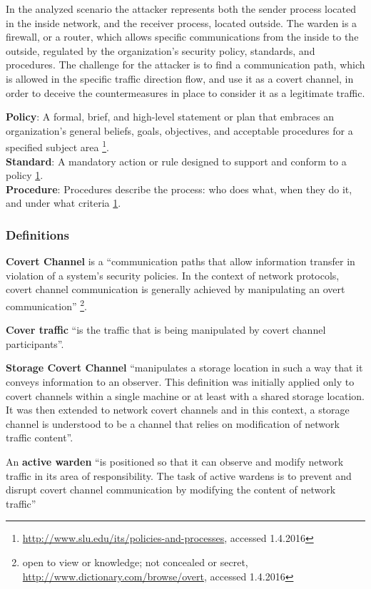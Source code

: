 \documentclass[12pt]{article}
\begin{document}
In the analyzed scenario the attacker represents both the sender process located in the inside network, and the receiver process, located outside. The warden is a firewall, or a router, which allows specific communications from the inside to the outside, regulated by the organization's security policy, standards, and procedures. The challenge for the attacker is to find a communication path, which is allowed in the specific traffic direction flow, and use it as a covert channel, in order to deceive the countermeasures in place to consider it as a legitimate traffic.

\textbf{Policy}: A formal, brief, and high-level statement or plan that embraces an organization's general beliefs, goals, objectives, and acceptable procedures for a specified subject area \footnote{\label{policy}\url{http://www.slu.edu/its/policies-and-processes}, accessed 1.4.2016}.\\
\textbf{Standard}: A mandatory action or rule designed to support and conform to a policy \cref{policy}.\\
\textbf{Procedure}: Procedures describe the process: who does what, when they do it, and under what criteria \cref{policy}.

\subsubsection{Definitions}
\label{subsub:definitions}

\textbf{Covert Channel} is a ``communication paths that allow information transfer in violation of a system’s security policies. In the context of network protocols, covert channel communication is generally achieved by manipulating an overt communication''\cite{netaware} \footnote{open to view or knowledge; not concealed or secret, \url{http://www.dictionary.com/browse/overt}, accessed 1.4.2016}.

\textbf{Cover traffic} ``is the traffic that is being manipulated by covert channel participants''\cite{netaware}.

\textbf{Storage Covert Channel} ``manipulates a storage location in such a way that it conveys information to an observer. This definition was initially applied only to covert channels within a single machine or at least with a shared storage location. It was then extended to network covert channels and in this context, a storage channel is understood to be a channel that relies on modification of network traffic content''\cite{netaware}.

An \textbf{active warden} ``is positioned so that it can observe and modify network traffic in its area of responsibility. The task of active wardens is to prevent and disrupt covert channel communication by modifying the content of network traffic''\cite{netaware}\\
\end{document}
